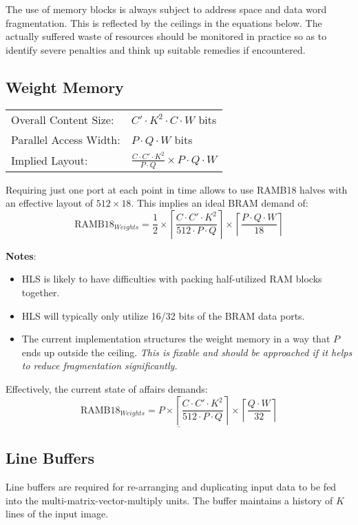 \documentclass[DIV12]{scrreprt}
\begin{document}
The use of memory blocks is always subject to address space and data
word fragmentation. This is reflected by the ceilings in the equations
below. The actually suffered waste of resources should be monitored in
practice so as to identify severe penalties and think up suitable
remedies if encountered.

\subsection{Weight Memory}
\begin{center}
\begin{tabular}{ll}\toprule
  Overall Content Size:  & $C'\cdot K^2\cdot C\cdot W$ bits\\
  Parallel Access Width: & $P\cdot Q\cdot W$ bits\\
  Implied Layout:        & $\frac{C\cdot C'\cdot K^2}{P\cdot Q}\times P\cdot Q\cdot W$\\\bottomrule
\end{tabular}
\end{center}

Requiring just one port at each point in time allows to use RAMB18
halves with an effective layout of $512\times 18$. This implies an
ideal BRAM demand of:
\[\mbox{RAMB18}_{Weights} =
  \frac{1}{2}\times
  \left\lceil\frac{C\cdot C'\cdot K^2}{512\cdot P\cdot Q}\right\rceil\times
  \left\lceil\frac{P\cdot Q\cdot W}{18}\right\rceil\]

\textbf{Notes}:
\begin{itemize}
\item
  HLS is likely to have difficulties with packing half-utilized RAM blocks
  together.
\item
  HLS will typically only utilize 16/32 bits of the BRAM data ports.
\item
  The current implementation structures the weight memory in a way
  that $P$ ends up outside the ceiling.\newline
  \emph{This is fixable and should be approached if it helps to
    reduce fragmentation significantly.}
\end{itemize}

Effectively, the current state of affairs demands:
\[\underline{\mbox{RAMB18}_{Weights} =
  P\times
  \left\lceil\frac{C\cdot C'\cdot K^2}{512\cdot P\cdot Q}\right\rceil\times
  \left\lceil\frac{Q\cdot W}{32}\right\rceil}\]


\subsection{Line Buffers}
Line buffers are required for re-arranging and duplicating input data
to be fed into the multi-matrix-vector-multiply units. The buffer
maintains a history of $K$ lines of the input image.
\end{document}
